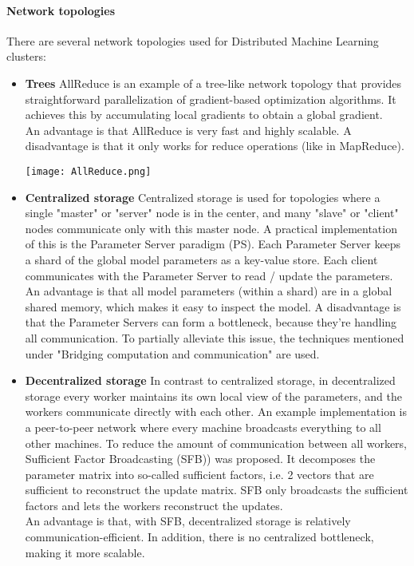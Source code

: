 \paragraph{Network topologies}
There are several network topologies used for Distributed Machine Learning clusters:
\begin{itemize}
	\item \textbf{Trees} AllReduce\cite{Agar14} is an example of a tree-like network topology that provides straightforward parallelization of gradient-based optimization algorithms. It achieves this by accumulating local gradients to obtain a global gradient.\\
	An advantage is that AllReduce is very fast and highly scalable. A disadvantage is that it only works for reduce operations (like in MapReduce).\\
	\begin{minipage}{\linewidth}
		\centering
		\texttt{[image: AllReduce.png]}
	\end{minipage}
	\item \textbf{Centralized storage} Centralized storage is used for topologies where a single "master" or "server" node is in the center, and many "slave" or "client" nodes communicate only with this master node. A practical implementation of this is the Parameter Server paradigm (PS). Each Parameter Server keeps a shard of the global model parameters as a key-value store. Each client communicates with the Parameter Server to read / update the parameters. \\
	An advantage is that all model parameters (within a shard) are in a global shared memory, which makes it easy to inspect the model. A disadvantage is that the Parameter Servers can form a bottleneck, because they're handling all communication. To partially alleviate this issue, the techniques mentioned under "Bridging computation and communication" are used.
	\item \textbf{Decentralized storage} In contrast to centralized storage, in decentralized storage every worker maintains its own local view of the parameters, and the workers communicate directly with each other. An example implementation is a peer-to-peer network where every machine broadcasts everything to all other machines. To reduce the amount of communication between all workers, Sufficient Factor Broadcasting (SFB)\cite{Li13}) was proposed. It decomposes the parameter matrix into so-called sufficient factors, i.e. 2 vectors that are sufficient to reconstruct the update matrix. SFB only broadcasts the sufficient factors and lets the workers reconstruct the updates.\\
	An advantage is that, with SFB, decentralized storage is relatively communication-efficient. In addition, there is no centralized bottleneck, making it more scalable.
\end{itemize}
